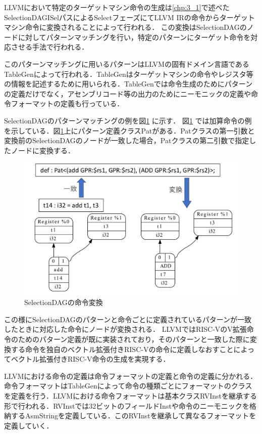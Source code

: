 
LLVMにおいて特定のターゲットマシン命令の生成は\ref{chp:3_1}で述べたSelectionDAGISelパスによるSelectフェーズにてLLVM IRの命令からターゲットマシン命令に変換されることによって行われる．
この変換はSelectionDAGのノードに対してパターンマッチングを行い，特定のパターンにターゲット命令を対応させる手法で行われる．

このパターンマッチングに用いるパターンはLLVMの固有ドメイン言語であるTableGenによって行われる．TableGenはターゲットマシンの命令やレジスタ等の情報を記述するために用いられる．TableGenでは命令生成のためにパターンの定義だけでなく，アセンブリコード等の出力のためにニーモニックの定義や命令フォーマットの定義も行っている．

SelectionDAGのパターンマッチングの例を図\ref{fig:SelectionDAG_example}
に示す．
図\ref{fig:SelectionDAG_example}
では加算命令の例を示している．図\ref{fig:SelectionDAG_example}上にパターン定義クラスPatがある．Patクラスの第一引数と変換前のSelectionDAGのノードが一致した場合，Patクラスの第二引数で指定したノードに変換する．

\begin{figure}[bt]
    \centering
    \includegraphics[scale=0.6]{image/SelectionDAG_example.pdf}
    \caption{SelectionDAGの命令変換}
    \label{fig:SelectionDAG_example}
\end{figure}

この様にSelectionDAGのパターンと命令ごとに定義されているパターンが一致したときに対応した命令にノードが変換される．
LLVMではRISC-VのV拡張命令のためのパターン定義が既に実装されており，そのパターンと一致した際に変換する命令を独自のベクトル拡張付きRISC-Vの命令に定義しなおすことによってベクトル拡張付きRISC-V命令の生成を実現する．

LLVMにおける命令の定義は命令フォーマットの定義と命令の定義に分かれる．命令フォーマットはTableGenによって命令の種類ごとにフォーマットのクラスを定義を行う．LLVMにおける命令フォーマットは基本クラスRVInstを継承する形で行われる．RVInstでは32ビットのフィールドInstや命令のニーモニックを格納するAsmStringを定義している．このRVInstを継承して異なるフォーマットを定義していく．


